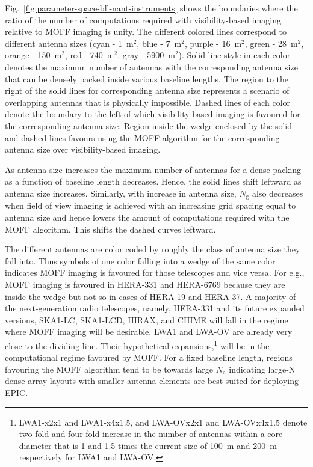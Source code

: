 \documentclass[a4paper,fleqn,usenatbib]{mnras}
\newcommand{\Nant}{N_\textrm{a}}
\newcommand{\Ngrid}{N_\textrm{g}}
\begin{document}
Fig.~\ref{fig:parameter-space-bll-nant-instruments} shows the boundaries where 
the ratio of the number of computations required with visibility-based imaging 
relative to MOFF imaging is unity. The different colored lines correspond to 
different antenna sizes (cyan - 1~m$^2$, blue - 7~m$^2$, purple - 16~m$^2$, 
green - 28~m$^2$, orange - 150~m$^2$, red - 740~m$^2$, gray - 5900~m$^2$). Solid 
line style in each color denotes the maximum number of antennas with the 
corresponding antenna size that can be densely packed inside various baseline 
lengths. The region to the right of the solid lines for corresponding antenna 
size represents a scenario of overlapping antennas that is physically 
impossible. Dashed lines of each color denote the boundary to the left of which 
visibility-based imaging is favoured for the corresponding antenna size. Region 
inside the wedge enclosed by the solid and dashed lines favours using the MOFF 
algorithm for the corresponding antenna size over visibility-based imaging. 

As antenna size increases the maximum number of antennas for a dense packing as 
a function of baseline length decreases. Hence, the solid lines shift leftward 
as antenna size increases. Similarly, with increase in antenna size, $\Ngrid$ 
also decreases when field of view imaging is achieved with an increasing grid 
spacing equal to antenna size and hence lowers the amount of computations 
required with the MOFF algorithm. This shifts the dashed curves leftward. 

The different antennas are color coded by roughly the class of antenna size 
they fall into. Thus symbols of one color falling into a wedge of the same color 
indicates MOFF imaging is favoured for those telescopes and vice versa. For 
e.g., MOFF imaging is favoured in HERA-331 and HERA-6769 because they are inside 
the wedge but not so in cases of HERA-19 and HERA-37. A majority of the 
next-generation radio telescopes, namely, HERA-331 and its future expanded 
versions, SKA1-LC, SKA1-LCD, HIRAX, and CHIME will fall in the regime where MOFF 
imaging will be desirable. LWA1 and LWA-OV are already very close to the dividing 
line. Their hypothetical expansions,\footnote{LWA1-x2x1 and LWA1-x4x1.5, and 
LWA-OVx2x1 and LWA-OVx4x1.5 denote two-fold and four-fold increase in the number 
of antennas within a core diameter that is 1 and 1.5 times the current size of 
100~m and 200~m respectively for LWA1 and LWA-OV.} will be in the computational 
regime favoured by MOFF. For a fixed baseline length, regions favouring the MOFF 
algorithm tend to be towards large $\Nant$ indicating large-N dense array 
layouts with smaller antenna elements are best suited for deploying EPIC.
\end{document}
